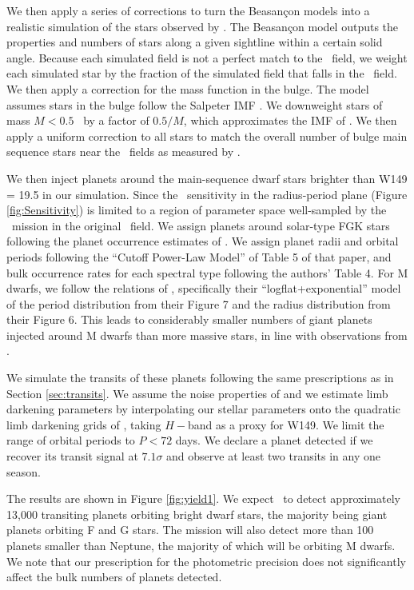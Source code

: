 We then apply a series of corrections to turn the Beasan\c{c}on models into a realistic
simulation of the stars observed by \WF. The Beasan\c{c}on model outputs the properties and numbers of stars along a given sightline within a certain solid angle.
Because each simulated field is not a perfect match to the \WF\ field, we weight each simulated star by the fraction of the simulated field that falls in the \WF\ field.
We then apply a correction for the mass function in the bulge. 
The model assumes stars in the bulge follow the Salpeter IMF \citep{Salpeter55}.
We downweight stars of mass $M< 0.5$ \msun\ by a factor of $0.5/M$, which approximates
the IMF of \citet{Kroupa01}.
We then apply a uniform correction to all stars to match the overall number of 
bulge main sequence stars near the \WF\ fields as measured by \citet{Calamida15}.

We then inject planets around the main-sequence
dwarf stars brighter than W149 = 19.5 in our simulation. Since the 
\WF\ sensitivity in the radius-period plane (Figure \ref{fig:Sensitivity}) is limited to a region of parameter space 
well-sampled by the \kep\ mission in the original \kep\ field.
We assign planets around solar-type FGK stars following the planet occurrence estimates 
of \citet{Howard12}.
We assign planet radii and orbital periods following the ``Cutoff Power-Law Model'' of Table 5 of
that paper, and bulk occurrence rates for each spectral type following the authors' Table 4.
For M dwarfs, we follow the relations of \citet{Morton14}, specifically their ``logflat+exponential''
model of the period distribution from their Figure 7 and the radius distribution from their Figure 6.
This leads to considerably smaller numbers of giant planets injected around M dwarfs than more massive
stars, in line with observations from \kep.

We simulate the transits of these planets following the same prescriptions as in Section \ref{sec:transits}.
We assume the noise properties of \citet{Gould15} and we estimate limb darkening parameters by interpolating our stellar parameters onto the
quadratic limb darkening grids of \citep{Claret11}, taking $H-$band as a proxy for W149. We limit the range of orbital periods to $P<72$ days.
We declare a planet detected if we 
recover its transit signal at $7.1\sigma$ and observe at least two transits in any one season.

The results are shown in Figure \ref{fig:yield1}. We expect \WF\ to detect approximately 13,000
transiting planets orbiting bright dwarf stars, the majority being giant planets orbiting F and G stars.
The mission will also detect more than 100 planets smaller than Neptune, the majority of which will
be orbiting M dwarfs. We note that our prescription for the photometric precision does not significantly affect the bulk numbers of planets detected.

